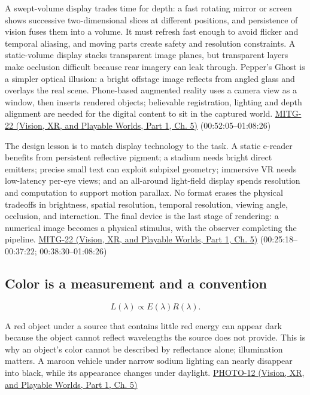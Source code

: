 A swept-volume display trades time for depth: a fast rotating mirror or screen shows successive two-dimensional slices at different positions, and persistence of vision fuses them into a volume. It must refresh fast enough to avoid flicker and temporal aliasing, and moving parts create safety and resolution constraints. A static-volume display stacks transparent image planes, but transparent layers make occlusion difficult because rear imagery can leak through. Pepper's Ghost is a simpler optical illusion: a bright offstage image reflects from angled glass and overlays the real scene. Phone-based augmented reality uses a camera view as a window, then inserts rendered objects; believable registration, lighting and depth alignment are needed for the digital content to sit in the captured world. \href{../07-Vision-XR-and-Playable-Worlds-P01/main.pdf\#nameddest=04-visual-computing-ii-ch036-mitg-22---output-devices}{MITG-22 (Vision, XR, and Playable Worlds, Part 1, Ch. 5)} (00:52:05--01:08:26)

The design lesson is to match display technology to the task. A static e-reader benefits from persistent reflective pigment; a stadium needs bright direct emitters; precise small text can exploit subpixel geometry; immersive VR needs low-latency per-eye views; and an all-around light-field display spends resolution and computation to support motion parallax. No format erases the physical tradeoffs in brightness, spatial resolution, temporal resolution, viewing angle, occlusion, and interaction. The final device is the last stage of rendering: a numerical image becomes a physical stimulus, with the observer completing the pipeline. \href{../07-Vision-XR-and-Playable-Worlds-P01/main.pdf\#nameddest=04-visual-computing-ii-ch036-mitg-22---output-devices}{MITG-22 (Vision, XR, and Playable Worlds, Part 1, Ch. 5)} (00:25:18--00:37:22; 00:38:30--01:08:26)

\subsection{Color is a measurement and a convention}\label{03-visual-computing-i-ch004-color-is-a-measurement-and-a-convention}

\hypertarget{03-visual-computing-i-ch004-color-is-a-measurement-and-a-convention}{}

\[
L(\lambda)\propto E(\lambda)R(\lambda).
\]

A red object under a source that contains little red energy can appear dark because the object cannot reflect wavelengths the source does not provide. This is why an object's color cannot be described by reflectance alone; illumination matters. A maroon vehicle under narrow sodium lighting can nearly disappear into black, while its appearance changes under daylight. \href{../07-Vision-XR-and-Playable-Worlds-P01/main.pdf\#nameddest=04-visual-computing-ii-ch036-photo-12---photography-session-12}{PHOTO-12 (Vision, XR, and Playable Worlds, Part 1, Ch. 5)}


